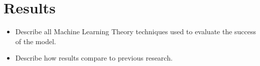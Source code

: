 \section{Results}

\begin{itemize}
  \item Describe all Machine Learning Theory techniques used to evaluate the success of the model.
  \item Describe how results compare to previous research.
\end{itemize}
